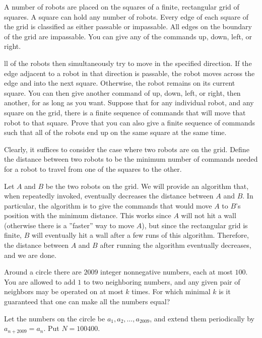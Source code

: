 \begin{example}[Canada 2014]
    A number of robots are placed on the squares of a finite, rectangular grid of squares. A square can hold any number of robots. Every edge of each square of the grid is classified as either passable or impassable. All edges on the boundary of the grid are impassable. You can give any of the commands up, down, left, or right.

    ll of the robots then simultaneously try to move in the specified direction. If the edge adjacent to a robot in that direction is passable, the robot moves across the edge and into the next square. Otherwise, the robot remains on its current square. You can then give another command of up, down, left, or right, then another, for as long as you want. Suppose that for any individual robot, and any square on the grid, there is a finite sequence of commands that will move that robot to that square. Prove that you can also give a finite sequence of commands such that all of the robots end up on the same square at the same time.
\end{example}

\sol Clearly, it suffices to consider the case where two robots are on the grid. Define the distance between two robots to be the minimum number of commands needed for a robot to travel from one of the squares to the other.

Let $A$ and $B$ be the two robots on the grid. We will provide an algorithm that, when repeatedly invoked, eventually decreases the distance between $A$ and $B$. In particular, the algorithm is to give the commands that would move $A$ to $B$'s position with the minimum distance. This works since $A$ will not hit a wall (otherwise there is a ''faster'' way to move $A$), but since the rectangular grid is finite, $B$ will eventually hit a wall after a few runs of this algorithm. Therefore, the distance between $A$ and $B$ after running the algorithm eventually decreases, and we are done.

\begin{example} [Russia 2009]
Around a circle there are $2009$ integer nonnegative numbers, each at most $100$. You are allowed to add $1$ to two neighboring numbers, and any given pair of neighbors may be operated on at most $k$ times. For which minimal $k$ is it guaranteed that one can make all the numbers equal?
\end{example}
\sol 
Let the numbers on the circle be $a_1,a_2,\dots,a_{2009}$, and extend them periodically by $a_{n+2009}=a_n$. Put $N=100400$.


